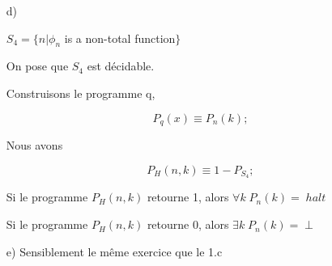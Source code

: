 \begin{itemize}
\item[d)]

$S_4 = \{n | \phi_n$ is a non-total function$\}$

On pose que $S_4$ est décidable.

Construisons le programme q,

$$P_q(x) \equiv P_n(k);$$

Nous avons

$$P_H(n,k) \equiv 1-P_{S_4};$$

Si le programme $P_H(n,k)$ retourne 1, alors $\forall k \; P_n(k) = \; halt$

Si le programme $P_H(n,k)$ retourne 0, alors $\exists k \; P_n(k) = \perp$

\item[e)] Sensiblement le même exercice que le 1.c
\end{itemize}